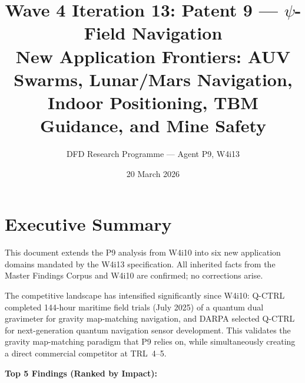 \documentclass[11pt]{article}
\title{\textbf{Wave 4 Iteration 13: Patent 9 --- $\psi$-Field Navigation}\\[6pt]
New Application Frontiers: AUV Swarms, Lunar/Mars Navigation,\\
Indoor Positioning, TBM Guidance, and Mine Safety}
\author{DFD Research Programme --- Agent P9, W4i13}
\date{20 March 2026}
\theoremstyle{definition}
\theoremstyle{remark}
\begin{document}
\maketitle
\tableofcontents
\newpage

\section*{Executive Summary}

This document extends the P9 analysis from W4i10 into six new application
domains mandated by the W4i13 specification. All inherited facts from the
Master Findings Corpus and W4i10 are confirmed; no corrections arise.

The competitive landscape has intensified significantly since W4i10:
Q-CTRL completed 144-hour maritime field trials (July 2025) of a quantum
dual gravimeter for gravity map-matching navigation, and DARPA selected
Q-CTRL for next-generation quantum navigation sensor development. This
validates the gravity map-matching paradigm that P9 relies on, while
simultaneously creating a direct commercial competitor at TRL~4--5.

\textbf{Top 5 Findings (Ranked by Impact):}
\end{document}
